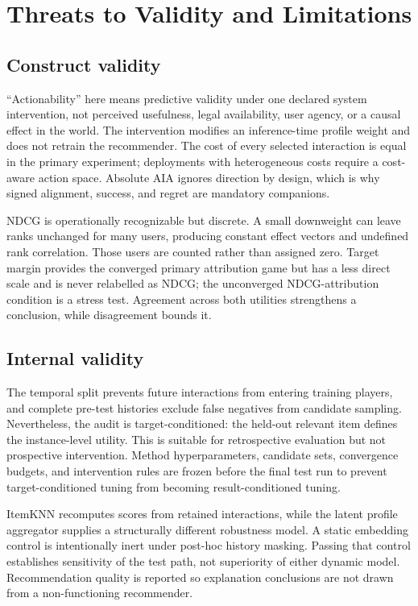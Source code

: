 \documentclass[11pt]{article}
\begin{document}
\section{Threats to Validity and Limitations}
\subsection{Construct validity}
``Actionability'' here means predictive validity under one declared system intervention, not perceived usefulness, legal availability, user agency, or a causal effect in the world. The intervention modifies an inference-time profile weight and does not retrain the recommender. The cost of every selected interaction is equal in the primary experiment; deployments with heterogeneous costs require a cost-aware action space. Absolute AIA ignores direction by design, which is why signed alignment, success, and regret are mandatory companions.

NDCG is operationally recognizable but discrete. A small downweight can leave ranks unchanged for many users, producing constant effect vectors and undefined rank correlation. Those users are counted rather than assigned zero. Target margin provides the converged primary attribution game but has a less direct scale and is never relabelled as NDCG; the unconverged NDCG-attribution condition is a stress test. Agreement across both utilities strengthens a conclusion, while disagreement bounds it.

\subsection{Internal validity}
The temporal split prevents future interactions from entering training players, and complete pre-test histories exclude false negatives from candidate sampling. Nevertheless, the audit is target-conditioned: the held-out relevant item defines the instance-level utility. This is suitable for retrospective evaluation but not prospective intervention. Method hyperparameters, candidate sets, convergence budgets, and intervention rules are frozen before the final test run to prevent target-conditioned tuning from becoming result-conditioned tuning.

ItemKNN recomputes scores from retained interactions, while the latent profile aggregator supplies a structurally different robustness model. A static embedding control is intentionally inert under post-hoc history masking. Passing that control establishes sensitivity of the test path, not superiority of either dynamic model. Recommendation quality is reported so explanation conclusions are not drawn from a non-functioning recommender.
\end{document}
